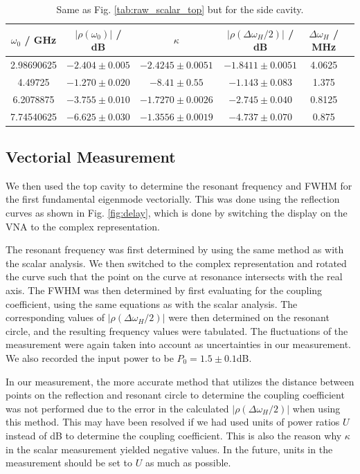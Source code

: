 \documentclass[a4paper]{report}
\numberwithin{equation}{section}
\begin{document}
\begin{table}[htb!]
	\centering
	\begin{tabular}{|c|c|c|c|c|c|}
		\hline $\omega_0$ / GHz & $\left| \rho(\omega_0) \right|$ / dB & $\kappa$ & $\left| \rho(\Delta\omega_H / 2) \right|$ / dB & $\Delta\omega_H$ / MHz\\ 
		\hline 2.98690625 & $-2.404 \pm 0.005$ & $-2.4245 \pm 0.0051$ & $-1.8411 \pm 0.0051$ & 4.0625 \\ 
		\hline 4.49725 & $-1.270 \pm 0.020$ & $-8.41 \pm 0.55$ & $-1.143 \pm 0.083$ & 1.375 \\
		\hline 6.2078875 & $-3.755 \pm 0.010$ & $ -1.7270 \pm 0.0026$ & $-2.745 \pm 0.040$ & 0.8125 \\
		\hline 7.74540625 & $-6.625 \pm 0.030$ & $-1.3556 \pm 0.0019$ & $-4.737 \pm 0.070$ & 0.875 \\ 
		\hline
	\end{tabular}
	\caption{Same as Fig. \ref{tab:raw_scalar_top} but for the side cavity. }
	\label{tab:raw_scalar_side}
\end{table}


\subsection{Vectorial Measurement}

We then used the top cavity to determine the resonant frequency and FWHM for the
first fundamental eigenmode vectorially. This was done using the reflection
curves as shown in Fig. \ref{fig:delay}, which is done by switching the display on the VNA to the complex representation. \par 

The resonant frequency was first determined by using the same method as with the
scalar analysis. We then switched to the complex representation and rotated the
curve such that the point on the curve at resonance intersects with the real
axis. The FWHM was then determined by first evaluating for the coupling
coefficient, using the same equations as with the scalar analysis. The
corresponding values of $|\rho(\Delta\omega_H / 2)|$ were then determined
on the resonant circle, and the resulting frequency values were tabulated.
The fluctuations of the measurement were again taken into account as uncertainties
in our measurement. We also recorded the input power to be $P_0 = 1.5 \pm 0.1$dB. \par 

In our measurement, the more accurate method that utilizes the distance between points on the reflection and resonant circle 
to determine the coupling coefficient was not performed due to the error in the calculated $|\rho(\Delta\omega_H / 2)|$
when using this method. This may have been resolved if we had used units of power ratios $U$ instead of dB to determine the 
coupling coefficient. This is also the reason why $\kappa$ in the scalar measurement yielded negative values. In the future,
units in the measurement should be set to $U$ as much as possible. \par 
\end{document}
